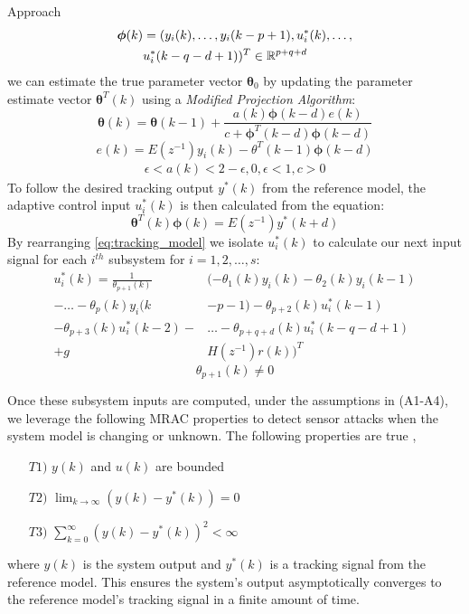\begin{section}{Approach}
	\begin{align}
	\begin{split}
	\bm{\phi}(k)&=(y_i(k), \dots ,y_i(k-p+1),u^*_i(k), \dots , \\
	& u^*_i(k-q-d+1))^T \in \mathbb{R}^{p+q+d}
	\end{split}
	\end{align}
we can estimate the true parameter vector $\bm{\theta}_0$ by updating the parameter estimate vector $\bm{\theta}^T(k)$ using a \textit{Modified Projection Algorithm}:
	\begin{equation}
	\label{eq:Modified_Proj_Algorithm}
	\bm{\theta}(k)=\bm{\theta}(k-1)+\frac{a(k)\bm{\phi}(k-d)e(k)}{c+\bm{\phi}^T(k-d)\bm{\phi}(k-d)}
	\end{equation}
	\begin{equation}
	e(k)=E(z^{-1})y_i(k)-\theta^T(k-1)\bm{\phi}(k-d)
	\end{equation}
	\begin{align*}
	\epsilon<a(k)<2-\epsilon, 0,\epsilon<1, c>0
	\end{align*}
To follow the desired tracking output $y^*(k)$ from the reference model, the adaptive control input $u^*_i(k)$ is then calculated from the equation:
    \begin{equation}
    \label{eq:tracking_model}
	\bm{\theta}^T(k)\bm{\phi}(k)=E(z^{-1})y^*(k+d)
	\end{equation}
By rearranging \eqref{eq:tracking_model} we isolate $u^*_i(k)$ to calculate our next input signal for each $i^{th}$ subsystem for $i=1,2,\dots,s$:
	\begin{align}
	\label{eq:End}
	u^*_i(k)=\frac{1}{\theta_{p+1}(k)}&(-\theta_1(k)y_i(k)-\theta_2(k)y_i(k-1)  \nonumber \\
    -\dots-\theta_p(k)y_i(k&-p-1)-\theta_{p+2}(k)u^*_i(k-1)  \\
	-\theta_{p+3}(k)u^*_i(k-2)-& \dots - \theta_{p+q+d}(k)u^*_i(k-q-d+1) \nonumber \\
	+g&H(z^{-1})r(k))^T \nonumber
	\end{align}
    \begin{equation}
	\theta_{p+1}(k)\neq0 \nonumber
	\end{equation}

Once these subsystem inputs are computed, under the assumptions in (A1-A4), we leverage the following MRAC properties to detect sensor attacks when the system model is changing or unknown. The following properties are true \cite{tao2003adaptive},
	\begin{enumerate}[label=(\roman*),leftmargin=4\parindent]
	\label{assumtions_ensure}
	\item[$T1)$] $y(k)$ and $u(k)$ are bounded 
	\item[$T2)$] $\lim_{k\to\infty}(y(k)-y^*(k))=0$
	\label{Truth2}
	\item[$T3)$] $\sum_{k=0}^\infty(y(k)-y^*(k))^2<\infty$
	\end{enumerate}
where $y(k)$ is the system output and $y^*(k)$ is a tracking signal from the reference model. This ensures the system's output asymptotically converges to the reference model's tracking signal in a finite amount of time. 



\end{section}
